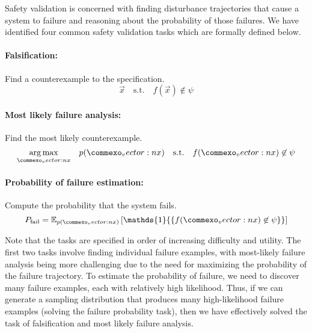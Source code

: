 Safety validation is concerned with finding disturbance trajectories that cause a system to failure and reasoning about the probability of those failures. We have identified four common safety validation tasks which are formally defined below.

\paragraph{Falsification:} Find a counterexample to the specification. 
\begin{equation} 
\vec{x} \quad \text{s.t.} \quad f(\vec{x}) \not \in \psi
\end{equation}

\paragraph{Most likely failure analysis:} Find the most likely counterexample.
\begin{equation}
\underset{\vec{x}}{\argmax} \quad p(\vec{x}) \quad \text{s.t.} \quad f(\vec{x}) \not \in \psi
\end{equation}

\paragraph{Probability of failure estimation:} Compute the probability that the system fails.
\begin{equation}
P_{\rm fail} = \mathbb{E}_{p(\vec{x})}\left[ \mathds{1}{\{ f(\vec{x}) \not \in \psi \}} \right]
\end{equation}


Note that the tasks are specified in order of increasing difficulty and utility. The first two tasks involve finding individual failure examples, with most-likely failure analysis being more challenging due to the need for maximizing the probability of the failure trajectory. To estimate the probability of failure, we need to discover many failure examples, each with relatively high likelihood. Thus, if we can generate a sampling distribution that produces many high-likelihood failure examples (solving the failure probability task), then we have effectively solved the task of falsification and most likely failure analysis.  

